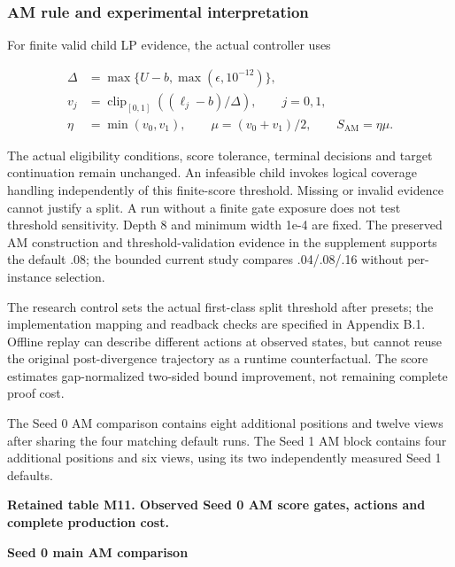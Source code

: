 \documentclass[
  american,
  11pt,
]{article}
\begin{document}
\subsubsection{AM rule and experimental
interpretation}\label{am-rule-and-experimental-interpretation}

For finite valid child LP evidence, the actual controller uses

\[
\begin{aligned}
\Delta&=\max\{U-b,\max(\epsilon, 10^{-12})\},\\
v_j&=\operatorname{clip}_{[0,1]}((\ell_j-b)/\Delta),\qquad j=0,1,\\
\eta&=\min(v_0,v_1),\qquad
\mu=(v_0+v_1)/2,\qquad S_{\mathrm{AM}}=\eta\mu.
\end{aligned}
\]

The actual eligibility conditions, score tolerance, terminal decisions
and target continuation remain unchanged. An infeasible child invokes
logical coverage handling independently of this finite-score threshold.
Missing or invalid evidence cannot justify a split. A run without a
finite gate exposure does not test threshold sensitivity. Depth 8 and
minimum width 1e-4 are fixed. The preserved AM construction and
threshold-validation evidence in the supplement supports the default
.08; the bounded current study compares .04/.08/.16 without per-instance
selection.

The research control sets the actual first-class split threshold after
presets; the implementation mapping and readback checks are specified in
Appendix B.1. Offline replay can describe different actions at observed
states, but cannot reuse the original post-divergence trajectory as a
runtime counterfactual. The score estimates gap-normalized two-sided
bound improvement, not remaining complete proof cost.

The Seed 0 AM comparison contains eight additional positions and twelve
views after sharing the four matching default runs. The Seed 1 AM block
contains four additional positions and six views, using its two
independently measured Seed 1 defaults.

\Needspace{358pt}

\textbf{Retained table M11. Observed Seed 0 AM score gates, actions and
complete production cost.}

\textbf{Seed 0 main AM comparison}
\end{document}
